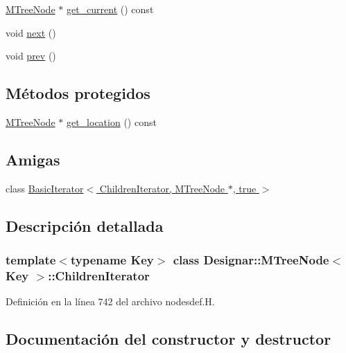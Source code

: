 \begin{DoxyCompactItemize}
\item 
\hyperlink{class_designar_1_1_m_tree_node}{M\+Tree\+Node} $\ast$ \hyperlink{class_designar_1_1_m_tree_node_1_1_children_iterator_a70ef87f4fdd20504fdb9927f49dc847d}{get\+\_\+current} () const
\item 
void \hyperlink{class_designar_1_1_m_tree_node_1_1_children_iterator_a49c1adf58fd0fa57cf45fa3ae4f57f26}{next} ()
\item 
void \hyperlink{class_designar_1_1_m_tree_node_1_1_children_iterator_addf6dc80ece81a04056796a6ec35354a}{prev} ()
\end{DoxyCompactItemize}
\subsection*{Métodos protegidos}
\begin{DoxyCompactItemize}
\item 
\hyperlink{class_designar_1_1_m_tree_node}{M\+Tree\+Node} $\ast$ \hyperlink{class_designar_1_1_m_tree_node_1_1_children_iterator_a59d7d79081ab145a9ab886ee4873ae57}{get\+\_\+location} () const
\end{DoxyCompactItemize}
\subsection*{Amigas}
\begin{DoxyCompactItemize}
\item 
class \hyperlink{class_designar_1_1_m_tree_node_1_1_children_iterator_a9318ecb15aa59102557883ca0b98fea5}{Basic\+Iterator$<$ Children\+Iterator, M\+Tree\+Node $\ast$, true $>$}
\end{DoxyCompactItemize}


\subsection{Descripción detallada}
\subsubsection*{template$<$typename Key$>$\newline
class Designar\+::\+M\+Tree\+Node$<$ Key $>$\+::\+Children\+Iterator}



Definición en la línea 742 del archivo nodesdef.\+H.



\subsection{Documentación del constructor y destructor}
\mbox{\label{class_designar_1_1_m_tree_node_1_1_children_iterator_ab050e655c7a557a50b2cdb390063e297}} 
